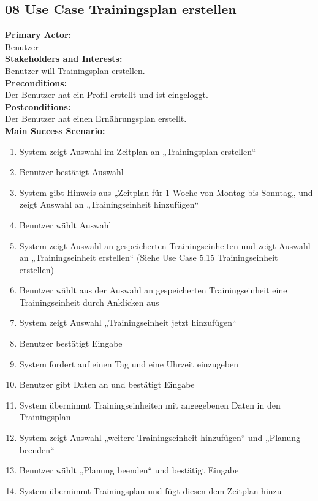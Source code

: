 \documentclass[12pt,a4paper,onecolumn]{article}
\begin{document}
\subsection{08 Use Case Trainingsplan erstellen}
\textbf{Primary Actor:}\\ Benutzer\\
\textbf{Stakeholders and Interests:}\\
Benutzer will \gls{Trainingsplan} erstellen.\\
\textbf{Preconditions:} \\ Der Benutzer hat ein Profil erstellt und ist eingeloggt.\\
\textbf{Postconditions:}\\Der Benutzer hat einen \gls{Ernährungsplan} erstellt.\\
\textbf{Main Success Scenario:}
\begin{enumerate}
    \item System zeigt Auswahl im Zeitplan an „Trainingsplan erstellen“
    \item Benutzer bestätigt Auswahl
    \item System gibt Hinweis aus „Zeitplan für 1 Woche von Montag bis Sonntag„ und zeigt Auswahl an „\gls{Trainingseinheit} hinzufügen“
    \item Benutzer wählt Auswahl 
    \item System zeigt Auswahl an gespeicherten \gls{Trainingseinheit}en und zeigt Auswahl an „\gls{Trainingseinheit} erstellen“ (Siehe Use Case 5.15 \gls{Trainingseinheit} erstellen)
    \item Benutzer wählt aus der Auswahl an gespeicherten \gls{Trainingseinheit} eine \gls{Trainingseinheit} durch Anklicken aus 
    \item System zeigt Auswahl „\gls{Trainingseinheit} jetzt hinzufügen“
    \item Benutzer bestätigt Eingabe
    \item System fordert auf einen Tag und eine Uhrzeit einzugeben
    \item Benutzer gibt Daten an und bestätigt Eingabe
    \item System übernimmt \gls{Trainingseinheit}en mit angegebenen Daten in den \gls{Trainingsplan}
    \item System zeigt Auswahl „weitere \gls{Trainingseinheit} hinzufügen“ und „Planung beenden“
    \item Benutzer wählt „Planung beenden“ und bestätigt Eingabe
    \item System übernimmt \gls{Trainingsplan} und fügt diesen dem Zeitplan hinzu
\end{enumerate}
\end{document}
